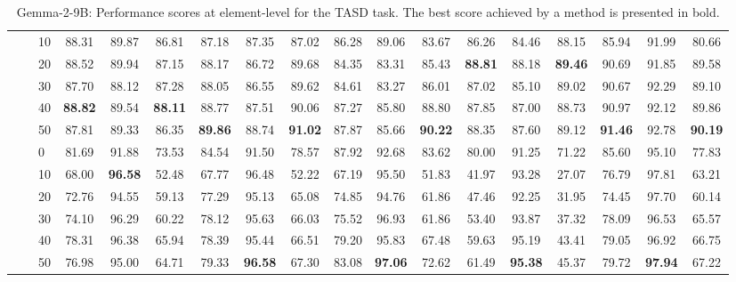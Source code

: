\begin{table*}[!h]
{\begin{tabular}{lllccc|ccc|ccc|ccc|ccc}
 \textbf{} & \textbf{} & 10 & 88.31 & 89.87 & 86.81 & 87.18 & 87.35 & 87.02 & 86.28 & 89.06 & 83.67 & 86.26 & 84.46 & 88.15 & 85.94 & 91.99 & 80.66 \\ 
 \textbf{} & \textbf{} & 20 & 88.52 & 89.94 & 87.15 & 88.17 & 86.72 & 89.68 & 84.35 & 83.31 & 85.43 & \textbf{88.81} & 88.18 & \textbf{89.46} & 90.69 & 91.85 & 89.58 \\ 
 \textbf{} & \textbf{} & 30 & 87.70 & 88.12 & 87.28 & 88.05 & 86.55 & 89.62 & 84.61 & 83.27 & 86.01 & 87.02 & 85.10 & 89.02 & 90.67 & 92.29 & 89.10 \\ 
 \textbf{} & \textbf{} & 40 & \textbf{88.82} & 89.54 & \textbf{88.11} & 88.77 & 87.51 & 90.06 & 87.27 & 85.80 & 88.80 & 87.85 & 87.00 & 88.73 & 90.97 & 92.12 & 89.86 \\ 
 \textbf{} & \textbf{} & 50 & 87.81 & 89.33 & 86.35 & \textbf{89.86} & 88.74 & \textbf{91.02} & 87.87 & 85.66 & \textbf{90.22} & 88.35 & 87.60 & 89.12 & \textbf{91.46} & 92.78 & \textbf{90.19} \\ 
 \arrayrulecolor{gray}\cline{2-18}\arrayrulecolor{black}
\textbf{} & \textbf{\multirow{6}{*}{SC}} & 0 & 81.69 & 91.88 & 73.53 & 84.54 & 91.50 & 78.57 & 87.92 & 92.68 & 83.62 & 80.00 & 91.25 & 71.22 & 85.60 & 95.10 & 77.83 \\ 
 \textbf{} & \textbf{} & 10 & 68.00 & \textbf{96.58} & 52.48 & 67.77 & 96.48 & 52.22 & 67.19 & 95.50 & 51.83 & 41.97 & 93.28 & 27.07 & 76.79 & 97.81 & 63.21 \\ 
 \textbf{} & \textbf{} & 20 & 72.76 & 94.55 & 59.13 & 77.29 & 95.13 & 65.08 & 74.85 & 94.76 & 61.86 & 47.46 & 92.25 & 31.95 & 74.45 & 97.70 & 60.14 \\ 
 \textbf{} & \textbf{} & 30 & 74.10 & 96.29 & 60.22 & 78.12 & 95.63 & 66.03 & 75.52 & 96.93 & 61.86 & 53.40 & 93.87 & 37.32 & 78.09 & 96.53 & 65.57 \\ 
 \textbf{} & \textbf{} & 40 & 78.31 & 96.38 & 65.94 & 78.39 & 95.44 & 66.51 & 79.20 & 95.83 & 67.48 & 59.63 & 95.19 & 43.41 & 79.05 & 96.92 & 66.75 \\ 
 \textbf{} & \textbf{} & 50 & 76.98 & 95.00 & 64.71 & 79.33 & \textbf{96.58} & 67.30 & 83.08 & \textbf{97.06} & 72.62 & 61.49 & \textbf{95.38} & 45.37 & 79.72 & \textbf{97.94} & 67.22 \\ 
\hline
\end{tabular}
}
\caption{Gemma-2-9B: Performance scores at element-level for the TASD task. The best score achieved by a method is presented in bold.}\label{fig:performance-scores-element-tasd}
\end{table*}
\newpage

